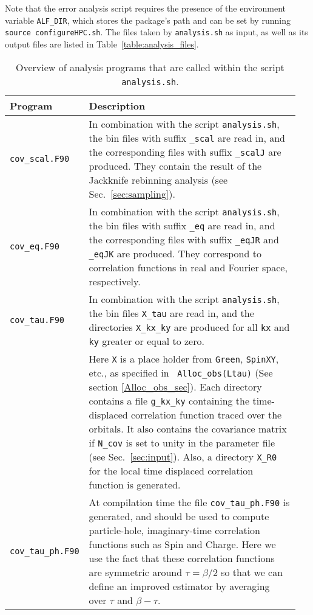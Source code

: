 Note that the error analysis script requires the presence of the environment variable \texttt{ALF\_DIR}, which stores the package's path and can be set by running \texttt{source configureHPC.sh}. The files taken by \texttt{analysis.sh} as input, as well as its output files are listed in Table~\ref{table:analysis_files}.

\begin{table}[h]
	\begin{center}
	\begin{tabular}{@{} p{0.15\linewidth} p{0.8\linewidth} @{}}\toprule
		Program & Description \\\midrule
		\texttt{cov\_scal.F90}  &  In combination with the script \texttt{analysis.sh}, the bin files with suffix \texttt{\_scal} are read in, and  the corresponding files with suffix \texttt{\_scalJ} are produced. They  contain the  result of the Jackknife rebinning analysis  (see Sec.~\ref{sec:sampling}).  \\
		\texttt{cov\_eq.F90}    &  In combination with the script \texttt{analysis.sh}, the bin files with suffix \texttt{\_eq} are read in, and the corresponding files with suffix  \texttt{\_eqJR}  and  \texttt{\_eqJK}  are produced. They  correspond to correlation functions in real and Fourier space, respectively.  \\
		\texttt{cov\_tau.F90}   &  In combination with the script \texttt{analysis.sh}, the bin files  \texttt{X\_tau} are read in, and the directories  \texttt{X\_kx\_ky} are produced  for all \texttt{kx} and \texttt{ky} greater or equal to zero. \\
		& Here \texttt{X}  is a place holder from \texttt{Green}, \texttt{SpinXY}, etc., as specified in \texttt{ Alloc\_obs(Ltau)} (See section \ref{Alloc_obs_sec}). Each directory contains  a  file    \texttt{g\_kx\_ky}  containing the  time-displaced correlation function traced over the  orbitals.  It also contains the covariance matrix if \texttt{N\_cov} is set to unity in the parameter file  (see Sec.~\ref{sec:input}). Also, a directory  \texttt{X\_R0}  for the local  time displaced  correlation function is generated.  \\                         
		\texttt{cov\_tau\_ph.F90} & At compilation time  the file \texttt{cov\_tau\_ph.F90} is generated, and  should be used to compute particle-hole, imaginary-time correlation functions such as Spin and Charge. Here we use the fact that these  correlation functions  are symmetric around $\tau = \beta/2$ so that we can define an improved estimator by averaging over $\tau$ and $\beta - \tau$.  
		\\\bottomrule
	\end{tabular}
	\caption{ Overview of analysis programs that are called within the script \texttt{analysis.sh}. \label{table:analysis_programs}}
\end{center}
\end{table}
